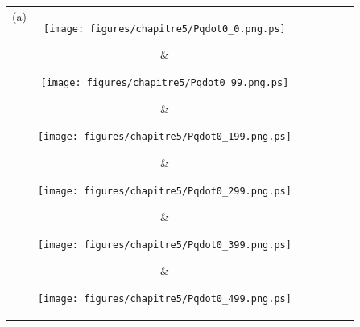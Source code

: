 \begin{figure*}[p]
\centering
\begin{tabular}{c@{}c@{}c@{}c@{}c@{}c@{}c}
(a)&
\parbox[c]{2.2cm}{\texttt{[image: figures/chapitre5/Pqdot0\_0.png.ps]}} &
\parbox[c]{2.2cm}{\texttt{[image: figures/chapitre5/Pqdot0\_99.png.ps]}} &
\parbox[c]{2.2cm}{\texttt{[image: figures/chapitre5/Pqdot0\_199.png.ps]}} &
\parbox[c]{2.2cm}{\texttt{[image: figures/chapitre5/Pqdot0\_299.png.ps]}} &
\parbox[c]{2.2cm}{\texttt{[image: figures/chapitre5/Pqdot0\_399.png.ps]}} &
\parbox[c]{2.2cm}{\texttt{[image: figures/chapitre5/Pqdot0\_499.png.ps]}}\\

(b)&
\parbox[c]{2.2cm}{\texttt{[image: figures/chapitre5/Pqdot1\_0.png.ps]}} &
\parbox[c]{2.2cm}{\texttt{[image: figures/chapitre5/Pqdot1\_99.png.ps]}} &
\parbox[c]{2.2cm}{\texttt{[image: figures/chapitre5/Pqdot1\_199.png.ps]}} &
\parbox[c]{2.2cm}{\texttt{[image: figures/chapitre5/Pqdot1\_299.png.ps]}} &
\parbox[c]{2.2cm}{\texttt{[image: figures/chapitre5/Pqdot1\_399.png.ps]}} &
\parbox[c]{2.2cm}{\texttt{[image: figures/chapitre5/Pqdot1\_499.png.ps]}}\\

(c)&
\parbox[c]{2.2cm}{\texttt{[image: figures/chapitre5/Pqdot2\_0.png.ps]}} &
\parbox[c]{2.2cm}{\texttt{[image: figures/chapitre5/Pqdot2\_99.png.ps]}} &
\parbox[c]{2.2cm}{\texttt{[image: figures/chapitre5/Pqdot2\_199.png.ps]}} &
\parbox[c]{2.2cm}{\texttt{[image: figures/chapitre5/Pqdot2\_299.png.ps]}} &
\parbox[c]{2.2cm}{\texttt{[image: figures/chapitre5/Pqdot2\_399.png.ps]}} &
\parbox[c]{2.2cm}{\texttt{[image: figures/chapitre5/Pqdot2\_499.png.ps]}}\\

(d)&
\parbox[c]{2.2cm}{\texttt{[image: figures/chapitre5/Pqdot3\_0.png.ps]}} &
\parbox[c]{2.2cm}{\texttt{[image: figures/chapitre5/Pqdot3\_99.png.ps]}} &
\parbox[c]{2.2cm}{\texttt{[image: figures/chapitre5/Pqdot3\_199.png.ps]}} &
\parbox[c]{2.2cm}{\texttt{[image: figures/chapitre5/Pqdot3\_299.png.ps]}} &
\parbox[c]{2.2cm}{\texttt{[image: figures/chapitre5/Pqdot3\_399.png.ps]}} &
\parbox[c]{2.2cm}{\texttt{[image: figures/chapitre5/Pqdot3\_499.png.ps]}}\\


\end{tabular}
\end{figure*}
